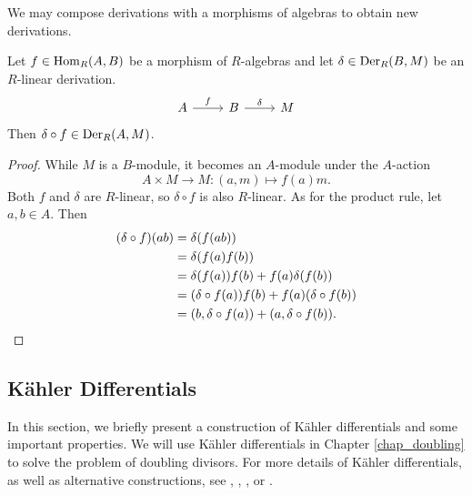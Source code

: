 We may compose derivations with a morphisms of algebras to obtain new derivations.

\begin{proposition}
  \label{prop_precompose_derivation}
  Let $f \in \operatorname{Hom}_R(A,B)$ be a morphism of $R$-algebras and let $\delta \in \operatorname{Der}_R(B,M)$ be an $R$-linear derivation.
  \[ \begin{tikzcd} A \arrow{r}{f} & B \arrow{r}{\delta} & M \end{tikzcd} \]
  Then $\delta \circ f \in \operatorname{Der}_R(A,M)$.
\end{proposition}
\begin{proof}
  While $M$ is a $B$-module, it becomes an $A$-module under the $A$-action
    \[ A \times M \to M : (a, m) \mapsto f(a)m. \]
  Both $f$ and $\delta$ are $R$-linear, so $\delta \circ f$ is also $R$-linear.
  As for the product rule, let $a, b \in A$. Then
  \begin{align*}
    (\delta \circ f)(ab)
      &= \delta(f(ab)) \\
      &= \delta(f(a)f(b)) \\
      &= \delta(f(a))f(b) + f(a)\delta(f(b)) \\
      &= (\delta \circ f(a))f(b) + f(a)(\delta \circ f(b)) \\
      &= (b, \delta \circ f(a)) + (a, \delta \circ f(b)). \qedhere
  \end{align*}
\end{proof}




\subsection{K\"ahler Differentials}
\label{sec_kahler_differentials}

In this section, we briefly present a construction of K\"ahler differentials and some important properties.
We will use K\"ahler differentials in Chapter \ref{chap_doubling} to solve the problem of doubling divisors.
For more details of K\"ahler differentials, as well as alternative constructions,
see \cite{eisenbud95}, \cite{eisenbud00}, \cite{goldschmidt03}, or \cite{stichtenoth09}.

